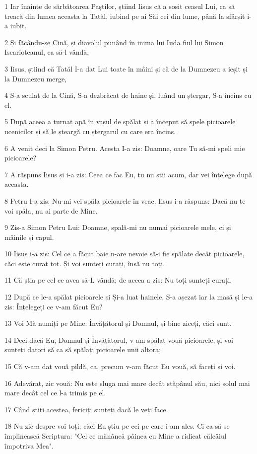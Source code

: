 \par 1 Iar înainte de sărbătoarea Paștilor, știind Iisus că a sosit ceasul Lui, ca să treacă din lumea aceasta la Tatăl, iubind pe ai Săi cei din lume, până la sfârșit i-a iubit.
\par 2 Și făcându-se Cină, și diavolul punând în inima lui Iuda fiul lui Simon Iscarioteanul, ca să-l vândă,
\par 3 Iisus, știind că Tatăl I-a dat Lui toate în mâini și că de la Dumnezeu a ieșit și la Dumnezeu merge,
\par 4 S-a sculat de la Cină, S-a dezbrăcat de haine și, luând un ștergar, S-a încins cu el.
\par 5 După aceea a turnat apă în vasul de spălat și a început să spele picioarele ucenicilor și să le șteargă cu ștergarul cu care era încins.
\par 6 A venit deci la Simon Petru. Acesta I-a zis: Doamne, oare Tu să-mi speli mie picioarele?
\par 7 A răspuns Iisus și i-a zis: Ceea ce fac Eu, tu nu știi acum, dar vei înțelege după aceasta.
\par 8 Petru I-a zis: Nu-mi vei spăla picioarele în veac. Iisus i-a răspuns: Dacă nu te voi spăla, nu ai parte de Mine.
\par 9 Zis-a Simon Petru Lui: Doamne, spală-mi nu numai picioarele mele, ci și mâinile și capul.
\par 10 Iisus i-a zis: Cel ce a făcut baie n-are nevoie să-i fie spălate decât picioarele, căci este curat tot. Și voi sunteți curați, însă nu toți.
\par 11 Că știa pe cel ce avea să-L vândă; de aceea a zis: Nu toți sunteți curați.
\par 12 După ce le-a spălat picioarele și Și-a luat hainele, S-a așezat iar la masă și le-a zis: Înțelegeți ce v-am făcut Eu?
\par 13 Voi Mă numiți pe Mine: Învățătorul și Domnul, și bine ziceți, căci sunt.
\par 14 Deci dacă Eu, Domnul și Învățătorul, v-am spălat vouă picioarele, și voi sunteți datori să ca să spălați picioarele unii altora;
\par 15 Că v-am dat vouă pildă, ca, precum v-am făcut Eu vouă, să faceți și voi.
\par 16 Adevărat, zic vouă: Nu este sluga mai mare decât stăpânul său, nici solul mai mare decât cel ce l-a trimis pe el.
\par 17 Când știți acestea, fericiți sunteți dacă le veți face.
\par 18 Nu zic despre voi toți; căci Eu știu pe cei pe care i-am ales. Ci ca să se împlinească Scriptura: "Cel ce mănâncă pâinea cu Mine a ridicat călcâiul împotriva Mea".

